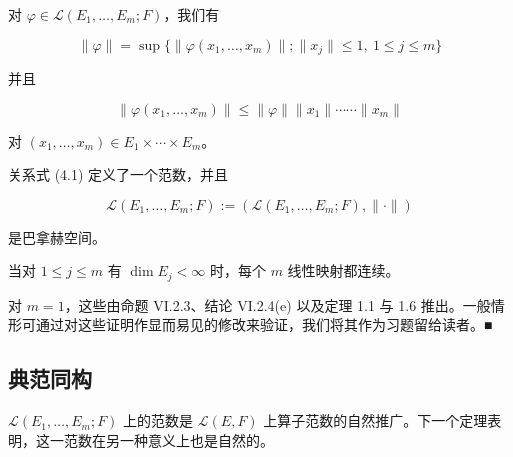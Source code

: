\begin{theorem}

\begin{subitems}
\item

对 $ \varphi \in \mathcal{L}(E_1, \ldots, E_m; F) $，我们有

\[
\|\varphi\| = \sup\{ \|\varphi(x_1, \ldots, x_m)\| ; \|x_j\| \le 1,\ 1 \le j \le m \}
\]

并且

\[
\|\varphi(x_1, \ldots, x_m)\| \le \|\varphi\|\|x_1\| \cdots\cdots \|x_m\|
\]

对 $ (x_1, \ldots, x_m) \in E_1 \times \cdots \times E_m $。

\item

关系式 (4.1) 定义了一个范数，并且

\[
\mathcal{L}(E_1, \ldots, E_m; F) := (\mathcal{L}(E_1, \ldots, E_m; F), \|\cdot\|)
\]

是巴拿赫空间。

\item

当对 $ 1 \le j \le m $ 有 $ \dim E_j < \infty $ 时，每个 $ m $ 线性映射都连续。

\proofhead
对 $ m = 1 $，这些由命题 VI.2.3、结论 VI.2.4(e) 以及定理 1.1 与 1.6 推出。一般情形可通过对这些证明作显而易见的修改来验证，我们将其作为习题留给读者。\nobreak\hspace{0.35em}■
\end{subitems}

\end{theorem}

\subsection*{典范同构}

$ \mathcal{L}(E_1, \ldots, E_m; F) $ 上的范数是 $ \mathcal{L}(E, F) $ 上算子范数的自然推广。下一个定理表明，这一范数在另一种意义上也是自然的。

